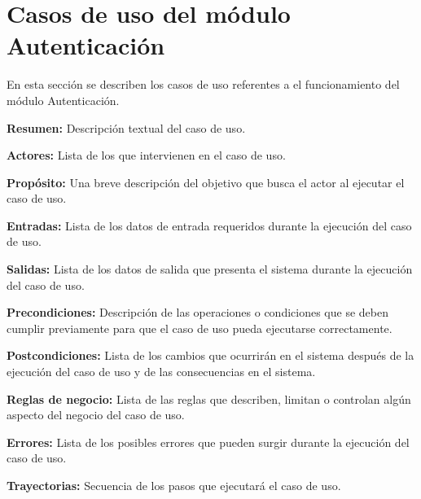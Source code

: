 
\section{Casos de uso del módulo Autenticación}
En esta sección se describen los casos de uso referentes a el funcionamiento del módulo Autenticación. \bigskip

     \begin{objetivos}
	\item {\bf Resumen:} Descripción textual del caso de uso.
	\item {\bf Actores:} Lista de los que intervienen en el caso de uso.
	\item {\bf Propósito:} Una breve descripción del objetivo que busca el actor al ejecutar el caso de uso.
	\item {\bf Entradas:} Lista de los datos de entrada requeridos durante la ejecución del caso de uso.
	\item {\bf Salidas:} Lista de los datos de salida que presenta el sistema durante la ejecución del caso de uso.
	\item {\bf Precondiciones:} Descripción de las operaciones o condiciones que se deben cumplir previamente para que el caso de uso pueda ejecutarse correctamente.
	\item {\bf Postcondiciones:} Lista de los cambios que ocurrirán en el sistema después de la ejecución del caso de uso y de las consecuencias en el sistema.
	\item {\bf Reglas de negocio:} Lista de las reglas que describen, limitan o controlan algún aspecto del negocio del caso de uso.
	\item {\bf Errores:} Lista de los posibles errores que pueden surgir durante la ejecución del caso de uso.
	\item {\bf Trayectorias:} Secuencia de los pasos que ejecutará el caso de uso.
    \end{objetivos}

